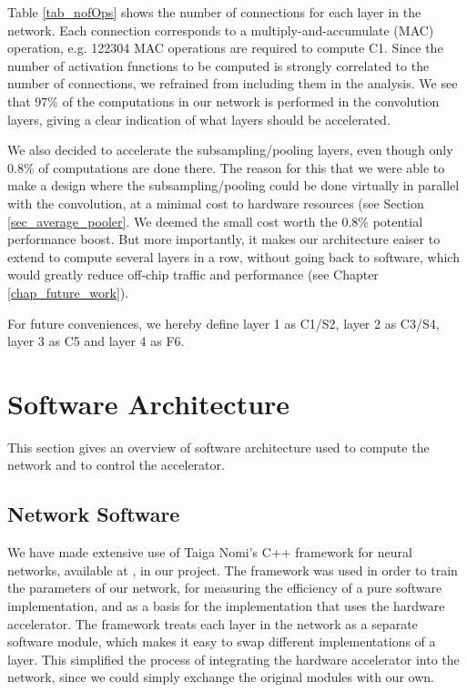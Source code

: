 Table \ref{tab_nofOps} shows the number of connections for each layer in the network. Each connection corresponds to a multiply-and-accumulate (MAC) operation, e.g. 122304 MAC operations are required to compute C1. Since the number of activation functions to be computed is strongly correlated to the number of connections, we refrained from including them in the analysis. 
We see that 97\% of the computations in our network is performed in the convolution layers, giving a clear indication of what layers should be accelerated.


We also decided to accelerate the subsampling/pooling layers, even though only 0.8\% of computations are done there. The reason for this that we were able to make a design where the subsampling/pooling could be done virtually in parallel with the convolution, at a minimal cost to hardware resources (see Section \ref{sec_average_pooler}. We deemed the small cost worth the 0.8\% potential performance boost. But more importantly, it makes our architecture eaiser to extend to compute several layers in a row, without going back to software, which would greatly reduce off-chip traffic and performance (see Chapter \ref{chap_future_work}).

For future conveniences, we hereby define layer 1 as C1/S2, layer 2 as C3/S4, layer 3 as C5 and layer 4 as F6.


\section{Software Architecture}

This section gives an overview of software architecture used to compute the network and to control the accelerator.

\subsection{Network Software}

We have made extensive use of Taiga Nomi's C++ framework for neural networks, available at \cite{Nomi2015}, in our project. The framework was used in order to train the parameters of our network, for measuring the efficiency of a pure software implementation, and as a basis for the implementation that uses the hardware accelerator. The framework treats each layer in the network as a separate software module, which makes it easy to swap different implementations of a layer. This simplified the process of integrating the hardware accelerator into the network, since we could simply exchange the original modules with our own.

